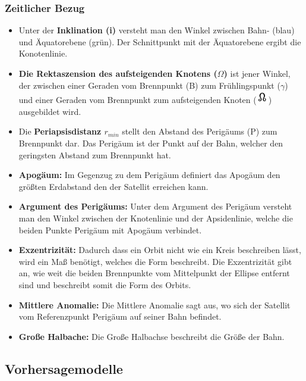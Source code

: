 \subsubsection*{Zeitlicher Bezug}
\begin{itemize}
	
	\item Unter der \textbf{Inklination (i)} versteht man den Winkel zwischen 
	Bahn- (blau) und Äquatorebene (grün). Der Schnittpunkt mit der Äquatorebene ergibt die
	Konotenlinie. 
	\item \textbf{Die Rektaszension des aufsteigenden Knotens (\ensuremath{\Omega})} ist jener Winkel, der zwischen einer Geraden vom Brennpunkt (B) zum Frühlingspunkt (\ensuremath{\gamma}) und einer Geraden vom Brennpunkt zum aufsteigenden Knoten (\includegraphics[scale=1.5]{./images/anode.jpg}) ausgebildet wird.  
	\item Die \textbf{Periapsisdistanz \ensuremath{r_{min}}} stellt den Abstand des Perigäums (P) zum Brennpunkt dar. Das Perigäum ist der Punkt auf der Bahn, welcher den geringsten Abstand zum Brennpunkt hat.
	\item \textbf{Apogäum:} Im Gegenzug zu dem Perigäum definiert das Apogäum 
	den größten Erdabstand den der Satellit erreichen kann.
	\item \textbf{Argument des Perigäums:} Unter dem Argument des Perigäum 
	versteht man den Winkel zwischen der Knotenlinie und der Apsidenlinie, welche 
	die beiden Punkte Perigäum mit Apogäum verbindet.
	\item \textbf{Exzentrizität:} Dadurch dass ein Orbit nicht wie ein Kreis 
	beschreiben lässt, wird ein Maß benötigt, welches die Form beschreibt. Die 
	Exzentrizität gibt an, wie weit die beiden Brennpunkte vom Mittelpunkt der 
	Ellipse entfernt sind und beschreibt somit die Form des Orbits.
	\item \textbf{Mittlere Anomalie:} Die Mittlere Anomalie sagt aus, wo sich 
	der Satellit vom Referenzpunkt Perigäum auf seiner Bahn befindet.
	\item \textbf{Große Halbache:} Die Große Halbachse beschreibt die Größe der
	Bahn.
	
\end{itemize}

\subsection{Vorhersagemodelle}

\clearpage